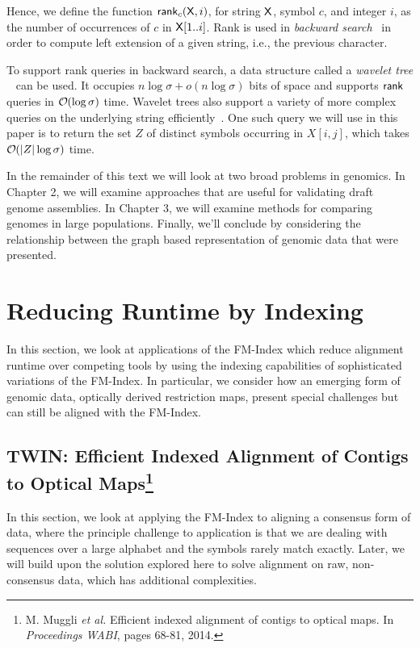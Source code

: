 Hence, we define the function
$\textsf{rank}_c(\mathsf{X}, i)$, for string $\mathsf{X}$, symbol $c$, and integer $i$, as
the number of occurrences of $c$ in $\mathsf{X}[1..i]$. Rank is used in {\em backward search}~\cite{fm2005} in order to compute left extension of a given string, i.e., the previous character.

To support rank queries in backward search, a data structure called a {\em wavelet tree} ~\cite{GNPtcs11}
can be used. It occupies $n\log\sigma + o(n\log\sigma)$
bits of space and supports $\textsf{rank}$ queries in $\bigO(\log\sigma)$ time.
Wavelet trees also support a variety of more complex queries on the underlying string  efficiently~\cite{GNPtcs11}.
One such query we will use in this paper
is to return the set $Z$ of
distinct symbols occurring in $X[i,j]$, which takes
$\bigO(|Z|\log\sigma)$ time.


In the remainder of this text we will look at two broad problems in genomics.  In Chapter 2, we will examine approaches that are useful for validating draft genome assemblies.  In Chapter 3, we will examine methods for comparing genomes in large populations.  Finally, we'll conclude by considering the relationship between the graph based representation of genomic data that were presented.






\chapter{Reducing Runtime by Indexing}
\bigskip

In this section, we look at applications of the FM-Index which reduce alignment runtime over competing tools by using the indexing capabilities of sophisticated variations of the FM-Index.  In particular, we consider how an emerging form of genomic data, optically derived restriction maps, present special challenges but can still be aligned with the FM-Index.


\section[TWIN: Efficient Indexed Alignment of Contigs to Optical Maps]{TWIN: Efficient Indexed Alignment of Contigs to Optical Maps\protect\footnote{M. Muggli {\it et al.} Efficient indexed alignment of contigs to optical maps. In {\it Proceedings WABI}, pages 68-81, 2014.}}

In this section, we look at applying the FM-Index to aligning a consensus form of data, where the principle challenge to application is that we are dealing with sequences over a large alphabet and the symbols rarely match exactly. Later, we will build upon the solution explored here to solve alignment on raw, non-consensus data, which has additional complexities.
